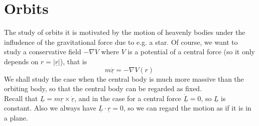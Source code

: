 \section{Orbits}
The study of orbits it is motivated by the motion of heavenly bodies under the infludence of the gravitational force due to e.g. a star.
Of course, we want to study a conservative field $-\nabla V$ where $V$ is a potential of a central force (so it only depends on $r=|\underline{r}|$), that is
$$m\underline{\ddot{r}}=-\nabla V(r)$$
We shall study the case when the central body is much more massive than the orbiting body, so that the central body can be regarded as fixed.\\
Recall that $\underline{L}=m\underline{r}\times\underline{\dot{r}}$, and in the case for a central force $\underline{\dot{L}}=0$, so $\underline{L}$ is constant.
Also we always have $\underline{L}\cdot\underline{r}=0$, so we can regard the motion as if it is in a plane.
